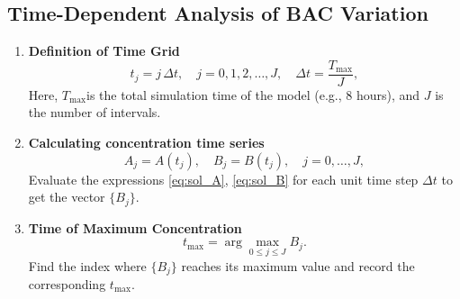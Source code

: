 \documentclass[11pt]{article}
\begin{document}
\subsection{Time-Dependent Analysis of BAC Variation}

\label{subsec:time_analysis}

\begin{enumerate}
  \item \textbf{Definition of Time Grid}\\
    \[
      t_j = j\,\Delta t,\quad j = 0,1,2,\dots,J,
      \quad
      \Delta t = \frac{T_{\max}}{J},
    \]
    Here, \(T_{\max}\)is the total simulation time of the model (e.g., 8 hours), and \(J\) is the number of intervals.

  \item \textbf{Calculating concentration time series}\\
    \[
      A_j = A(t_j), \quad B_j = B(t_j),
      \quad j=0,\dots,J,
    \]
    Evaluate the expressions \eqref{eq:sol_A}, \eqref{eq:sol_B} for each unit time step \(\Delta t\) to get the vector \(\{B_j\}\).

  \item \textbf{Time of Maximum Concentration}\\
    \[
      t_{\max} = \arg\max_{0\le j\le J} B_j.
    \]
    Find the index where \(\{B_j\}\) reaches its maximum value and record the corresponding \(t_{\max}\).


\end{enumerate}
\end{document}
